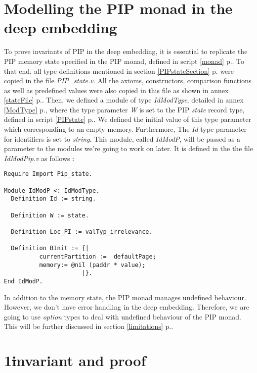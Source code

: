 \section{Modelling the PIP monad in the deep embedding}
To prove invariants of PIP in the deep embedding, it is essential to replicate the PIP memory state specified in the PIP monad, defined in script \ref{monad} p.\pageref{monad}. To that end, all type definitions mentioned in section \ref{PIPstateSection} p.\pageref{PIPstateSection} were copied in the file \textit{PIP\_state.v}. All the axioms, constructors, comparison functions as well as predefined values were also copied in this file as shown in annex \ref{stateFile} p.\pageref{stateFile}. Then, we defined a module of type \textit{IdModType}, detailed in annex \ref{ModType} p.\pageref{ModType}, where the type parameter \textit{W} is set to the PIP \textit{state} record type, defined in script \ref{PIPstate} p.\pageref{PIPstate}. We defined the initial value of this type parameter which corresponding to an empty memory. Furthermore, The \textit{Id} type parameter for identifiers is set to \textit{string}. This module, called \textit{IdModP}, will be passed as a parameter to the modules we're going to work on later. It is defined in the the file \textit{IdModPip.v} as follows :
\begin{lstlisting}[caption = {PIP state in the deep embedding}, xleftmargin=.1\textwidth,
xrightmargin=.1\textwidth]
Require Import Pip_state.

Module IdModP <: IdModType.
  Definition Id := string.
  
  Definition W := state.

  Definition Loc_PI := valTyp_irrelevance.

  Definition BInit := {|
          currentPartition :=  defaultPage;
          memory:= @nil (paddr * value);
                      |}.
End IdModP.
\end{lstlisting} \vspace{4pt}

In addition to the memory state, the PIP monad manages undefined behaviour. However, we don't have error handling in the deep embedding. Therefore, we are going to use \textit{option} types to deal with undefined behaviour of the PIP monad. This will be further discussed in section \ref{limitations} p.\pageref{limitations}.

\section{1\st invariant and proof} 

